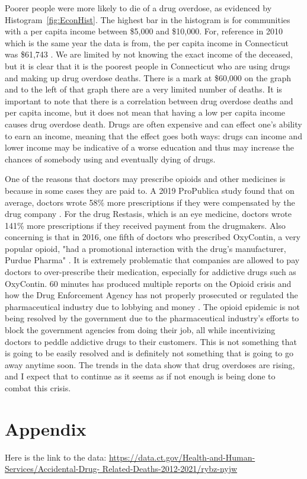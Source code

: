 \documentclass[12pt, letterpaper, titlepage]{article}
\begin{document}
Poorer people were more likely to die of a drug overdose, as evidenced by Histogram~\ref{fig:EconHist}.  The highest bar in the histogram is for communities with a per capita income between \$5,000 and \$10,000.  For, reference in 2010 which is the same year the data is from, the per capita income in Connecticut was \$61,743 \citet{fred_2023}.  We are limited by not knowing the exact income of the deceased, but it is clear that it is the poorest people in Connecticut who are using drugs and making up drug overdose deaths.  There is a mark at \$60,000 on the graph and to the left of that graph there are a very limited number of deaths.  It is  important to note that there is a correlation between drug overdose deaths and per capita income, but it does not mean that having a low per capita income causes drug overdose death.  Drugs are often expensive and can effect one's ability to earn an income, meaning that the effect goes both ways: drugs can income and lower income may be indicative of a worse education and thus may increase the chances of somebody using and eventually dying of drugs.

One of the reasons that doctors may prescribe opioids and other medicines is because in some cases they are paid to.  A 2019 ProPublica study found that on average, doctors wrote 58\% more prescriptions if they were compensated by the drug company \citep{fresques_2019}.  For the drug Restasis, which is an eye medicine, doctors wrote 141\% more prescriptions if they received payment from the drugmakers.  Also concerning is that in 2016, one fifth of doctors who prescribed OxyContin, a very popular opioid, "had a promotional interaction with the drug's manufacturer, Purdue Pharma" \citep{fresques_2019}.  It is extremely problematic that companies are allowed to pay doctors to over-prescribe their medication, especially for addictive drugs such as OxyContin.  60 minutes has produced multiple reports on the Opioid crisis and how the Drug Enforcement Agency has not properly prosecuted or regulated the pharmaceutical industry due to lobbying and money \citep{cbs_2020}.  The opioid epidemic is not being resolved by the government due to the pharmaceutical industry's efforts to block the government agencies from doing their job, all while incentivizing doctors to peddle addictive drugs to their customers.  This is not something that is going to be easily resolved and is definitely not something that is going to go away anytime soon.  The trends in the data show that drug overdoses are rising, and I expect that to continue as it seems as if not enough is being done to combat this crisis.

\section{Appendix}
Here is the link to the data: \url{https://data.ct.gov/Health-and-Human-Services/Accidental-Drug-
Related-Deaths-2012-2021/rybz-nyjw}



\end{document}
